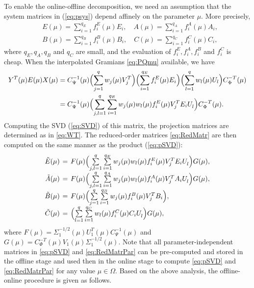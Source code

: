 To enable the online-offline decomposition, we need an assumption that the system matrices in (\ref{eq:psys}) 
depend affinely on the parameter $\mu$. More precisely,
\begin{align*}%
&E(\mu) = \sum\limits_{i=1}^{q_E}f_i^E(\mu)E_i,\quad A(\mu) = \sum\limits_{i=1}^{q_A}f_i^A(\mu)A_i,\\
&B(\mu) = \sum\limits_{i=1}^{q_B}f_i^B(\mu)B_i, \quad C(\mu) = \sum\limits_{i=1}^{q_C}f_i^C(\mu)C_i,
\end{align*}
where $q_E, q_A, q_B$ and $q_C$ are small, and the evaluation of $f_i^E,f_i^A,f_i^B$ and $f_i^C$ is  cheap. When the interpolated Gramians \eqref{eq:PQmu} available, we have
\begin{align}\notag
Y^T(\mu)E(\mu)X(\mu) &= C_{\Psi}^{-1}(\mu)\Bigl(\sum\limits_{j=1}^q w_j(\mu) V_j^T\Bigr)\Bigl(\sum\limits_{i=1}^{q_E}f_i^E(\mu)E_i\Bigr)\Bigl(\sum\limits_{l=1}^q w_l(\mu) U_l\Bigr)C_{\Phi}^{-T}(\mu)\\
& = C_{\Psi}^{-1}(\mu)\Bigl(\sum\limits_{j,l=1}^{q}\sum\limits_{i=1}^{q_E} w_j(\mu)w_l(\mu)f_i^E(\mu) V_j^TE_iU_l^{}\Bigr)C_{\Phi}^{-T}(\mu).
\label{eq:pSVD}
\end{align}
Computing the SVD (\ref{eq:SVD}) of this matrix, the projection matrices are determined as in \eqref{eq:WT}. 
The reduced-order matrices \eqref{eq:RedMatr} are then computed on the same manner as the product (\ref{eq:pSVD}):
\begin{equation}
\arraycolsep=2pt
\begin{array}{rcl}
\tilde{E}(\mu) & = & %
F(\mu)\Bigl(\sum\limits_{j,l=1}^{q}\sum\limits_{i=1}^{q_E} w_j(\mu)w_l(\mu)f_i^E(\mu) V_j^TE_iU_l^{}\Bigr)G(\mu),\\
\tilde{A}(\mu) & = & F(\mu)\Bigl(\sum\limits_{j,l=1}^{q}\sum\limits_{i=1}^{q_A} w_j(\mu)w_l(\mu)f_i^A(\mu) V_j^T A_iU_l^{}\Bigr)G(\mu),\\
\tilde{B}(\mu) & = & F(\mu)\Bigl(\sum\limits_{j=1}^{q}\sum\limits_{i=1}^{q_B} w_j(\mu)f_i^B(\mu) V_j^T B_i\Bigr),\\
\tilde{C}(\mu) & = & \Bigl(\sum\limits_{l=1}^{q}\sum\limits_{i=1}^{q_C} w_l(\mu)f_i^C(\mu) C_iU_l^{}\Bigr)G(\mu),
\end{array}
\label{eq:RedMatrPar}
\end{equation}
where $F(\mu)=\Sigma_1^{-1/2}(\mu)U_1^T(\mu)C_{\Psi}^{-1}(\mu)$ and $G(\mu)=C_{\Phi}^{-T}(\mu)V_1(\mu) \Sigma_1^{-1/2}(\mu)$. Note that all parameter-independent matrices in \eqref{eq:pSVD} and \eqref{eq:RedMatrPar} can be pre-computed and stored in the offline stage and used then in the online stage to compute \eqref{eq:pSVD} and \eqref{eq:RedMatrPar} for any value $\mu\in\Omega$. 
Based on the above analysis, the offline-online procedure is given as follows.

